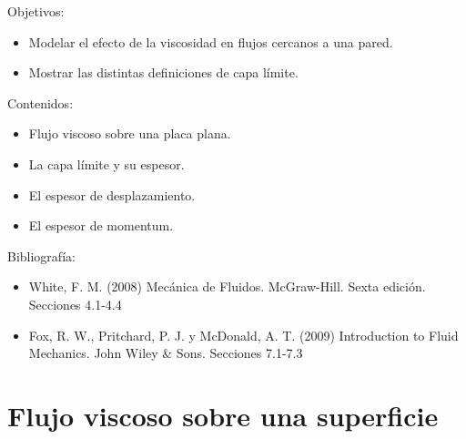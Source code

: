 \begin{framed}

Objetivos:
\begin{itemize}
    \item Modelar el efecto de la viscosidad en flujos cercanos a una pared.
    \item Mostrar las distintas definiciones de capa límite.
\end{itemize}

Contenidos:
\begin{itemize}
    \item Flujo viscoso sobre una placa plana.
    \item La capa límite y su espesor.
    \item El espesor de desplazamiento.
    \item El espesor de momentum.
\end{itemize}

Bibliografía:
\begin{itemize}
    \item White, F. M. (2008) Mecánica de Fluidos. McGraw-Hill. Sexta edición. Secciones 4.1-4.4
    \item Fox, R. W., Pritchard, P. J. y McDonald, A. T. (2009) Introduction to Fluid Mechanics. John Wiley \& Sons. Secciones 7.1-7.3
\end{itemize}
\end{framed}

\section*{Flujo viscoso sobre una superficie}

